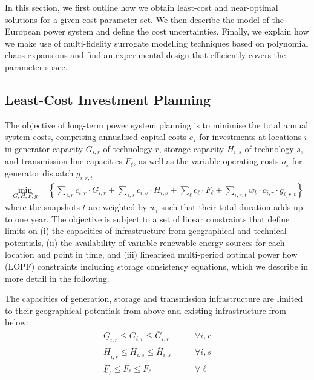 In this section,
we first outline how we obtain least-cost and near-optimal solutions for a given cost parameter set.
We then describe the model of the European power system and define the cost uncertainties. 
Finally, we explain how we make use of multi-fidelity surrogate modelling
techniques based on polynomial chaos expansions
and find an experimental design that efficiently covers the parameter space.

\subsection{Least-Cost Investment Planning}
\label{sec:leastcost}

The objective of long-term power system planning is to minimise the total
annual system costs, comprising annualised capital costs $c_\star$ for investments at locations $i$
in generator capacity $G_{i,r}$ of technology $r$, storage capacity $H_{i,s}$ of technology $s$, and transmission line capacities
$F_{\ell}$, as well as the variable operating costs $o_\star$ for generator dispatch $g_{i,r,t}$:
\begin{align}
    \min_{G,H,F,g} \quad \left\{
        \sum_{i,r}   c_{i,r}  \cdot G_{i,r}  +
        \sum_{i,s}   c_{i,s}  \cdot H_{i,s}  +
        \sum_{\ell}  c_{\ell} \cdot F_{\ell} +
        \sum_{i,r,t} w_t \cdot o_{i,r} \cdot g_{i,r,t}
    \right\}
    \label{eq:objective}
\end{align}
where the snapshots $t$ are weighted by $w_t$ such that their total duration
adds up to one year. The objective is subject to a set of linear constraints that define limits on
(i) the capacities of infrastructure from geographical and technical potentials,
(ii) the availability of variable renewable energy sources for each location and point in time, and
(iii) linearised multi-period optimal power flow (LOPF) constraints including storage consistency equations,
which we describe in more detail in the following.

The capacities of generation, storage and transmission infrastructure are
limited to their geographical potentials from above and existing infrastructure from below:
\begin{align}
    \label{eq:firstA}
    \underline{G}_{i,r}  \leq G_{i,r}  \leq \overline{G}_{i,r}  &\qquad\forall i, r \\
    \underline{H}_{i,s}  \leq H_{i,s}  \leq \overline{H}_{i,s}  &\qquad\forall i, s \\
    \underline{F}_{\ell} \leq F_{\ell} \leq \overline{F}_{\ell} &\qquad\forall \ell
\end{align}

